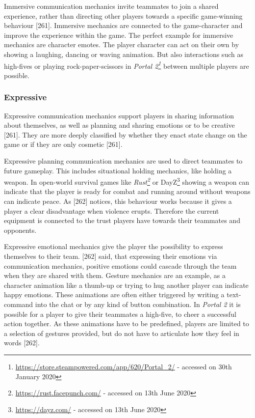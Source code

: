 Immersive communication mechanics invite teammates to join a shared experience, rather than directing other players towards a specific game-winning behaviour \autocite{Toups2014ATheory}[261].
Immersive mechanics are connected to the game-character and improve the experience within the game. The perfect example for immersive mechanics are character emotes. The player character can act on their own by showing a laughing, dancing or waving animation. But also interactions such as high-fives or playing rock-paper-scissors in \textit{Portal 2\footnote{\url{https://store.steampowered.com/app/620/Portal_2/} - accessed on 30th January 2020}} between multiple players are possible.

\subsubsection{Expressive}
\label{section:Expressive}
 Expressive communication mechanics support players in sharing information about themselves, as well as planning and sharing emotions or to be creative \autocite{Toups2014ATheory}[261]. They are more deeply classified by whether they enact state change on the game or if they are only cosmetic \autocite{Toups2014ATheory}[261].


Expressive planning communication mechanics are used to direct teammates to future gameplay. This includes situational holding mechanics, like holding a weapon. In open-world survival games like \textit{Rust\footnote{\url{https://rust.facepunch.com/} - accessed on 13th June 2020}} or DayZ\footnote{\url{https://dayz.com/} - accessed on 13th June 2020} showing a weapon can indicate that the player is ready for combat and running around without weapons can indicate peace. As \textcite{Toups2014ATheory}[262] notices, this behaviour works because it gives a player a clear disadvantage when violence erupts. Therefore the current equipment is connected to the trust players have towards their teammates and opponents.


Expressive emotional mechanics give the player the possibility to express themselves to their team. \textcite{Toups2014ATheory}[262] said, that expressing their emotions via communication mechanics, positive emotions could cascade through the team when they are shared with them. Gesture mechanics are an example, as a character animation like a thumb-up or trying to hug another player can indicate happy emotions. These animations are often either triggered by writing a text-command into the chat or by any kind of button combination. In \textit{Portal 2} it is possible for a player to give their teammates a high-five, to cheer a successful action together. As these animations have to be predefined, players are limited to a selection of gestures provided, but do not have to articulate how they feel in words \autocite{Toups2014ATheory}[262].

